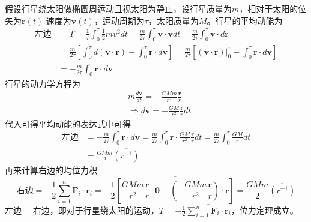 \documentclass[10pt,a4paper]{article}
\theoremstyle{remark}
\begin{document}
假设行星绕太阳做椭圆周运动且视太阳为静止，设行星质量为$m$，相对于太阳的位矢为$\textbf{r}(t)$ 速度为$\textbf{v}(t)$，运动周期为$\tau$，太阳质量为$M$。行星的平均动能为
\begin{align*}
\mbox{左边} &= \overline{T} = \frac{1}{\tau}\int_0^{\tau}\frac{1}{2}mv^2dt = \frac{m}{2\tau}\int_0^{\tau}\textbf{v}\cdot\textbf{v}dt = \frac{m}{2\tau}\int_0^{\tau}\textbf{v}\cdot d\textbf{r}\\
&= \frac{m}{2\tau}[\int_0^{\tau}d(\textbf{v}\cdot\textbf{r}) - \int_0^{\tau}\textbf{r}\cdot d\textbf{v}] = \frac{m}{2\tau}[(\textbf{v}\cdot\textbf{r})|_0^{\tau} - \int_0^{\tau}\textbf{r}\cdot d\textbf{v}]\\
&= -\frac{m}{2\tau}\int_0^{\tau}\textbf{r}\cdot d\textbf{v}
\end{align*}
行星的动力学方程为
\begin{align*}
&m\frac{d\textbf{v}}{dt} = -\frac{GMm}{r^2}\frac{\textbf{r}}{r}\\
&\Longrightarrow d\textbf{v} = -\frac{GM}{r^2}\frac{\textbf{r}}{r}dt
\end{align*}
代入可得平均动能的表达式中可得
\begin{align*}
\mbox{左边} &= -\frac{m}{2\tau}\int_0^{\tau}\textbf{r}\cdot d\textbf{v} = \frac{m}{2\tau}\int_0^{\tau}\textbf{r}\cdot\frac{GM}{r^2}\frac{\textbf{r}}{r}dt = \frac{m}{2\tau}\int_0^{\tau}\frac{GM}{r}dt\\
&= \frac{GMm}{2}\overline{(r^{-1})}
\end{align*}
再来计算右边的均位力积
\[
\mbox{右边} = -\frac{1}{2}\overline{\sum_{i = 1}^{n}\textbf{F}_i\cdot\textbf{r}_i} = -\frac{1}{2}\overline{[\frac{GMm}{r^2}\frac{\textbf{r}}{r}\cdot\textbf{0} + (-\frac{GMm}{r^2}\frac{\textbf{r}}{r})\cdot\textbf{r}]} = \frac{GMm}{2}\overline{(r^{-1})}
\]
左边$=$右边，即对于行星绕太阳的运动，$\overline{T} = -\frac{1}{2}\overline{\sum_{i = 1}^{n}\textbf{F}_i\cdot\textbf{r}_i}$，位力定理成立。
\end{document}
